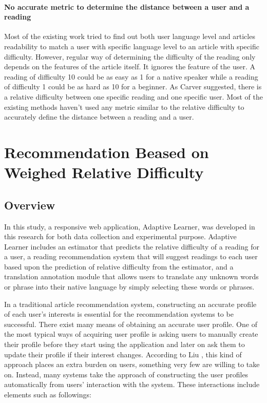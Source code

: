 \subsubsection{No accurate metric to determine the distance between a user and a reading}
\vspace{10pt}
Most of the existing work tried to find out both user language level and articles readability to match a user with specific language level to an article with specific difficulty. However, regular way of determining the difficulty of the reading only depends on the features of the article itself. It ignores the feature of the user. A reading of difficulty 10 could be as easy as 1 for a native speaker while a reading of difficulty 1 could be as hard as 10 for a beginner. As Carver suggested, there is a relative difficulty between one specific reading and one specific user. Most of the existing methods haven't used any metric similar to the relative difficulty to accurately define the distance between a reading and a user. 


\chapter{Recommendation Beased on Weighed Relative Difficulty}

\section{Overview}

In this study, a responsive web application, Adaptive Learner, was developed in this research for both data collection and experimental purpose. Adaptive Learner includes an estimator that predicts the relative difficulty of a reading for a user, a reading recommendation system that will suggest readings to each user based upon the prediction of relative difficulty from the estimator, and a translation annotation module that allows users to translate any unknown words or phrase into their native language by simply selecting these words or phrases.

In a traditional article recommendation system, constructing an accurate profile of each user's interests is essential for the recommendation systems to be successful. \cite{liu2010personalized} There exist many means of obtaining an accurate user profile. One of the most typical ways of acquiring user profile is asking users to manually create their profile before they start using the application and later on ask them to update their profile if their interest changes. According to Liu \cite{liu2010personalized}, this kind of approach places an extra burden on users, something very few are willing to take on. Instead, many systems take the approach of constructing the user profiles automatically from users' interaction with the system. These interactions include elements such as followings:
